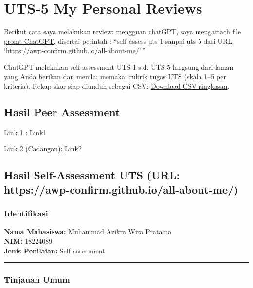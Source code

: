 \documentclass[
  letterpaper,
  DIV=11,
  numbers=noendperiod]{scrreprt}
\begin{document}

\chapter{UTS-5 My Personal Reviews}\label{uts-5-my-personal-reviews}

Berikut cara saya melakukan review: mengguan chatGPT, saya mengattach
\href{skor_uts.pdf}{file promt ChatGPT}, disertai perintah : ``self
assess uts-1 sanpai uts-5 dari URL
`https://awp-confirm.github.io/all-about-me/'\,''

ChatGPT melakukan self-assessment UTS-1 s.d. UTS-5 langsung dari laman
yang Anda berikan dan menilai memakai rubrik tugas UTS (skala 1--5 per
kriteria). Rekap skor siap diunduh sebagai CSV:
\href{Self-Assessment_UTS-1_s_d__UTS-5__dibuat_otomatis_.csv}{Download
CSV ringkasan}.

\section{Hasil Peer Assessment}\label{hasil-peer-assessment}

Link 1 : \href{UTS-5_Skor.xlsx}{Link1}

Link 2 (Cadangan):
\href{https://docs.google.com/spreadsheets/d/1fZ07IFHIUJn8kwhApUMrOGOz6-yZqwej/edit?gid=18198366\#gid=18198366}{Link2}

\section{Hasil Self-Assessment UTS (URL:
https://awp-confirm.github.io/all-about-me/)}\label{hasil-self-assessment-uts-url-httpsawp-confirm.github.ioall-about-me}

\subsection*{Identifikasi}\label{identifikasi}

\textbf{Nama Mahasiswa:} Muhammad Azikra Wira Pratama\\
\textbf{NIM:} 18224089\\
\textbf{Jenis Penilaian:} Self-assessment

\begin{center}\rule{0.5\linewidth}{0.5pt}\end{center}

\subsection*{Tinjauan Umum}\label{tinjauan-umum}
\end{document}
